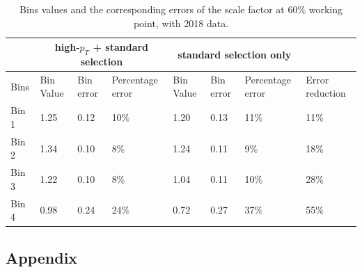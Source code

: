 \documentclass[letterpaper,12pt]{article}
\begin{document}
 \begin{table}[h]
 \begin{centering}
 \begin{tabular}{|p{2.5em}||p{2.5em}|p{2.5em}|p{5em}||p{2.5em}|p{2.5em}|p{5em}||p{5em}|}
          \hline
          & \multicolumn{3}{|c||}{high-$p_{T}$ + standard selection} & \multicolumn{3}{|c||}{standard selection only} & \\  \hline\hline
          Bins& Bin Value &Bin error&Percentage error&Bin Value &Bin error&Percentage error & Error reduction\\ \hline
          Bin 1 & 1.25 & 0.12 & 10\% &1.20 & 0.13 & 11\% & 11\% \\ \hline
          Bin 2 & 1.34 & 0.10 & 8\% & 1.24 & 0.11 & 9\% & 18\% \\ \hline
          Bin 3 & 1.22 & 0.10 & 8\% & 1.04 & 0.11 & 10\% & 28\% \\ \hline
          Bin 4 & 0.98 & 0.24 & 24\% & 0.72 & 0.27 & 37\% & 55\% \\ \hline
          
 
 \end{tabular} 
 \caption{Bins values and the corresponding errors of the scale factor at 60\% working point, with 2018 data.}
 \end{centering}
 \label{tab:limit}
 \end{table}

\fi

\newpage
\printbibliography
\newpage

\appendix
\subsection{Appendix}
\newpage
\newpage
\end{document}

